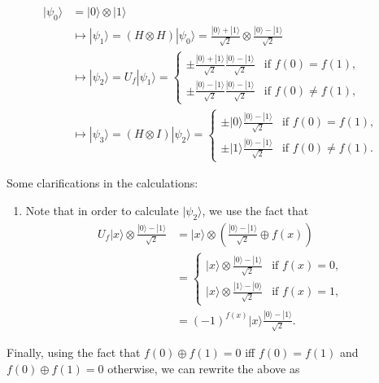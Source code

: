 \documentclass{article}
\theoremstyle{definition}
\begin{document}
    \begin{align*} 
      |\psi_0 \rangle &= |0 \rangle \otimes |1\rangle \\
      &\longmapsto |\psi_1 \rangle = (H \otimes H) |\psi_0 \rangle = \frac{|0\rangle + |1\rangle}{\sqrt{2}} \otimes \frac{|0\rangle - |1\rangle}{\sqrt{2}} \\
      &\longmapsto |\psi_2 \rangle = U_f |\psi_1 \rangle = \begin{cases} 
      \pm \frac{|0\rangle + |1\rangle}{\sqrt{2}} \frac{|0\rangle - |1\rangle}{\sqrt{2}} & \text{if } f(0) = f(1), \\
      \pm \frac{|0\rangle - |1\rangle}{\sqrt{2}} \frac{|0\rangle - |1\rangle}{\sqrt{2}} & \text{if } f(0) \neq f(1),
      \end{cases} \\
      &\longmapsto |\psi_3 \rangle = (H \otimes I) |\psi_2 \rangle = \begin{cases} 
      \pm |0\rangle \frac{|0\rangle - |1\rangle}{\sqrt{2}} & \text{if } f(0) = f(1), \\
      \pm |1\rangle \frac{|0\rangle - |1\rangle}{\sqrt{2}} & \text{if } f(0) \neq f(1).
    \end{cases}
    \end{align*}

    Some clarifications in the calculations:

    \begin{enumerate}
      \item Note that in order to calculate $|\psi_2 \rangle$, we use the fact that
      \begin{align*} 
        U_f |x\rangle \otimes \frac{|0\rangle - |1\rangle}{\sqrt{2}} &= |x\rangle \otimes \left(\frac{|0\rangle - |1\rangle}{\sqrt{2}} \oplus f(x)\right) \\
        &= \begin{cases} 
        |x\rangle \otimes \frac{|0\rangle - |1\rangle}{\sqrt{2}} & \text{if } f(x) = 0, \\
        |x\rangle \otimes \frac{|1\rangle - |0\rangle}{\sqrt{2}} & \text{if } f(x) = 1,
        \end{cases} \\
        &= (-1)^{f(x)}  |x\rangle \frac{|0\rangle - |1\rangle}{\sqrt{2}}.
      \end{align*}
    \end{enumerate}

    Finally, using the fact that $f(0) \oplus f(1) = 0$ iff $f(0) = f(1)$ and $f(0) \oplus f(1) = 0$ otherwise, we can rewrite the above as 
\end{document}

